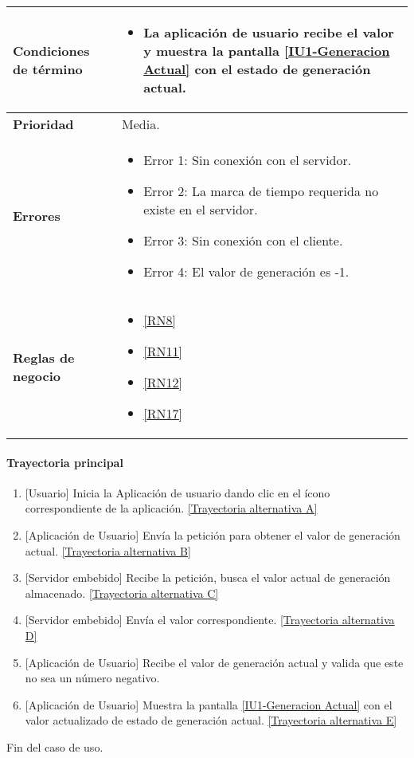\begin{longtable}{|J{5cm}|J{10.3cm}|}
	\textbf{Condiciones de término} & 
		\begin{itemize}
			\item La aplicación de usuario recibe el valor y muestra la pantalla \hyperref[fig:monitoreo]{[IU1-Generacion Actual]} con el estado de generación actual.
		\end{itemize} \\ \hline 
	\textbf{Prioridad} & 
		Media. \\ \hline
	\textbf{Errores} & 
		\begin{itemize}
		    \item \label{CUU1.1:Error1} Error 1: Sin conexión con el servidor.
			\item \label{CUU1.1:Error2} Error 2: La marca de tiempo requerida no existe en el servidor.
		    \item \label{CUU1.1:Error3} Error 3: Sin conexión con el cliente.
		    \item \label{CUU1.1:Error4} Error 4: El valor de generación es -1.
		\end{itemize} \\ \hline
	\textbf{Reglas de negocio} & 
		\begin{itemize}
		    \item \ref{RN8}
			\item \ref{RN11}
			\item \ref{RN12}
			\item \ref{RN17}
		\end{itemize} \\ \hline
\end{longtable}

\paragraph{Trayectoria principal}
    \label{SUB-U-CU1.1:TP}
	\begin{enumerate}
	    \item {[Usuario]} Inicia la Aplicación de usuario dando clic en el ícono correspondiente de la aplicación. \hyperref[SUB-U-CU1.1:TA]{[Trayectoria alternativa A]}
	    \item {[Aplicación de Usuario]} Envía la petición para obtener el valor de generación actual. \hyperref[SUB-U-CU1.1:TB]{[Trayectoria alternativa B]} 
	    \item {[Servidor embebido]} Recibe la petición, busca el valor actual de generación almacenado. \hyperref[SUB-U-CU1.1:TC]{[Trayectoria alternativa C]}
	    \item {[Servidor embebido]} Envía el valor correspondiente. \hyperref[SUB-U-CU1.1:TD]{[Trayectoria alternativa D]} 
	    \item {[Aplicación de Usuario]} Recibe el valor de generación actual y valida que este no sea un número negativo.
	    \item {[Aplicación de Usuario]} Muestra la pantalla \hyperref[fig:monitoreo]{[IU1-Generacion Actual]} con el valor actualizado de estado de generación actual. \hyperref[SUB-U-CU1.1:TE]{[Trayectoria alternativa E]}
	\end{enumerate}
	Fin del caso de uso.

